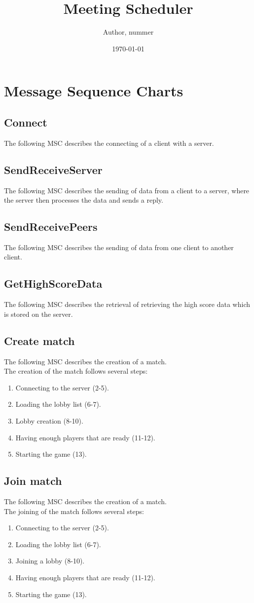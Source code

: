 \documentclass[a4paper,twoside,11pt]{article}
\title{\vspace{-\baselineskip}\sffamily\bfseries Meeting Scheduler}
\author{Author, nummer}
\date{\today}
\begin{document}
\section{Message Sequence Charts}
\subsection{Connect}
The following MSC describes the connecting of a client with a server.

\subsection{SendReceiveServer}
The following MSC describes the sending of data from a client to a server, where the server then processes the data and sends a reply.

\subsection{SendReceivePeers}
The following MSC describes the sending of data from one client to another client.

\subsection{GetHighScoreData}
The following MSC describes the retrieval of retrieving the high score data which is stored on the server.

\subsection{Create match}
The following MSC describes the creation of a match.\\
The creation of the match follows several steps:
\begin{enumerate}
\item Connecting to the server (2-5).
\item Loading the lobby list (6-7).
\item Lobby creation (8-10).
\item Having enough players that are ready (11-12).
\item Starting the game (13).
\end{enumerate}

\subsection{Join match}
The following MSC describes the creation of a match.\\
The joining of the match follows several steps:
\begin{enumerate}
\item Connecting to the server (2-5).
\item Loading the lobby list (6-7).
\item Joining a lobby (8-10).
\item Having enough players that are ready (11-12).
\item Starting the game (13).
\end{enumerate}
\end{document}
